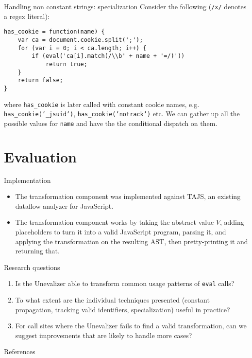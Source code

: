 \documentclass{beamer}
\begin{document}
\begin{frame}[fragile]{Handling non constant strings: specialization}
Consider the following ({\tt /x/} denotes a regex literal):
\vspace{5mm}
\begin{verbatim}
has_cookie = function(name) {
    var ca = document.cookie.split(';');
    for (var i = 0; i < ca.length; i++) {
        if (eval('ca[i].match(/\\b' + name + '=/)'))
            return true;
    }
    return false;
}
\end{verbatim}
where {\tt has\_cookie} is later called with constant cookie names,
e.g. {\tt has\_cookie('\_jsuid')}, {\tt has\_cookie('notrack')} etc. We
can gather up all the possible values for {\tt name} and have the
the conditional dispatch on them.
\end{frame}
             
\section{Evaluation}

\begin{frame}{Implementation}
\begin{itemize}
\item The transformation component was implemented against TAJS, an existing
dataflow analyzer for JavaScript.
\item The transformation component works by taking the abstract value $V$,
adding placeholders to turn it into a valid JavaScript program, parsing it,
and applying the transformation on the resulting AST, then pretty-printing
it and returning that.
\end{itemize}
\end{frame}

\begin{frame}{Research questions}
\begin{enumerate}
\item Is the Unevalizer able to transform common usage patterns of
{\tt eval} calls?
\item To what extent are the individual techniques presented (constant
propagation, tracking valid identifiers, specialization) useful in practice?
\item For call sites where the Unevalizer fails to find a valid
transformation, can we suggest improvements that are likely to handle
more cases?
\end{enumerate}
\end{frame}

\begin{frame}{References}

{\footnotesize
}
\end{frame}
\end{document}

